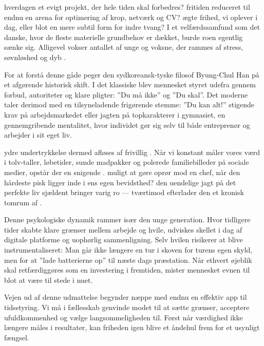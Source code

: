  hverdagen et evigt projekt, der hele tiden skal forbedres?  fritiden reduceret til endnu en arena for optimering af krop, netværk og CV?  ægte frihed, vi oplever i dag, eller blot en mere subtil form for indre tvang? I et velfærdssamfund som det danske, hvor de fleste materielle grundbehov er dækket, burde roen egentlig sænke sig. Alligevel vokser antallet af unge og voksne, der rammes af stress, søvnløshed og dyb .

For at forstå denne gåde peger den sydkoreansk-tyske filosof Byung-Chul Han på et afgørende historisk skift. I det klassiske  blev mennesket styret udefra gennem forbud, autoriteter og klare pligter: ”Du må ikke” og ”Du skal”. Det moderne  taler derimod med en tilsyneladende frigørende stemme: ”Du kan alt!”  stigende krav på arbejdsmarkedet eller jagten på topkarakterer i gymnasiet,  en gennemgribende mentalitet, hvor individet gør sig selv til både entreprenør og arbejder i sit eget liv.

 ydre undertrykkelse dermed afløses af frivillig . Når vi konstant måler vores værd i tolv-taller, løbetider, sunde madpakker og polerede familiebilleder på sociale medier, opstår der en snigende .  muligt at gøre oprør mod en chef, når den hårdeste pisk ligger inde i ens egen bevidsthed?  den uendelige jagt på det perfekte liv sjældent bringer varig ro --- tværtimod efterlader den et kronisk tomrum af .

Denne psykologiske dynamik rammer især den unge generation. Hvor tidligere tider skabte klare grænser mellem arbejde og hvile, udviskes skellet i dag af digitale platforme og uophørlig sammenligning. Selv hvilen risikerer at blive instrumentaliseret: Man går ikke længere en tur i skoven for turens egen skyld, men for at ”lade batterierne op” til næste dags præstation. Når ethvert øjeblik skal retfærdiggøres som en investering i fremtiden, mister mennesket evnen til blot at være til stede i nuet.

Vejen ud af denne udmattelse begynder næppe med endnu en effektiv app til tidsstyring. Vi må i fællesskab genvinde modet til at sætte grænser, acceptere ufuldkommenhed og vælge langsommeligheden til. Først når værdighed ikke længere måles i resultater, kan friheden igen blive et åndehul frem for et usynligt fængsel.

